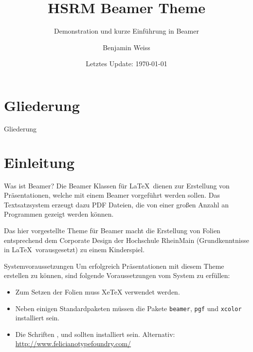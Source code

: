 \documentclass[compress]{beamer}
\title{HSRM Beamer Theme}
\subtitle{Demonstration und kurze Einführung in Beamer}
\date{Letztes Update: \today}
\author{Benjamin Weiss}
\institute{Studienbereich Informations- und Elektrotechnik\\Hochschule {\Medium RheinMain}}
\begin{document}

\maketitle


\section*{Gliederung}
\begin{frame}{Gliederung}
	\tableofcontents[hideallsubsections]
\end{frame}

\section{Einleitung}

\begin{frame}{Was ist Beamer?}
	Die Beamer Klassen für \LaTeX\ dienen zur Erstellung von Präsentationen, welche mit einem Beamer vorgeführt werden sollen. Das Textsatzsystem erzeugt dazu PDF Dateien, die von einer großen Anzahl an Programmen gezeigt werden können.
	
	Das hier vorgestellte Theme für Beamer macht die Erstellung von Folien entsprechend dem Corporate Design der Hochschule {\Medium RheinMain} (Grundkenntnisse in \LaTeX\ vorausgesetzt) zu einem Kinderspiel.
\end{frame}

\begin{frame}{Systemvoraussetzungen}
	Um erfolgreich Präsentationen mit diesem Theme erstellen zu können, sind folgende Voraussetzungen vom System zu erfüllen:
	\begin{itemize}
		\item Zum Setzen der Folien muss XeTeX verwendet werden.
		\item Neben einigen Standardpaketen müssen die Pakete \texttt{beamer}, \texttt{pgf} und \texttt{xcolor} installiert sein.
		\item Die Schriften ,  und  sollten installiert sein. Alternativ: \\\url{http://www.felicianotypefoundry.com/}
	\end{itemize}
\end{frame}
\end{document}
